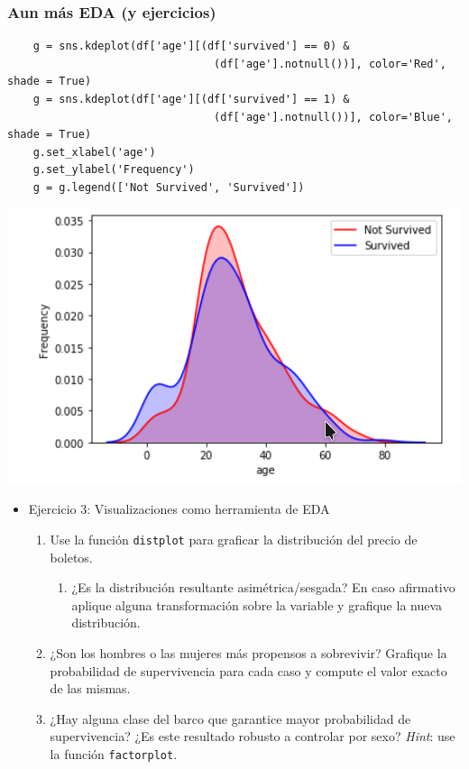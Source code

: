 \documentclass[leqno, 10pt, envcountsect]{beamer}
\numberwithin{equation}{section}
\theoremstyle{definition}
\theoremstyle{example}
\numberwithin{figure}{section}
\numberwithin{table}{section}
\let\olditem\item
\renewcommand{\item}{%
\olditem\vspace{1pt}}
\begin{document}
\begin{frame}[fragile]
  \frametitle{Aun más EDA (y ejercicios)}
    \begin{verbatim}
    g = sns.kdeplot(df['age'][(df['survived'] == 0) &
                                (df['age'].notnull())], color='Red', shade = True)
    g = sns.kdeplot(df['age'][(df['survived'] == 1) &
                                (df['age'].notnull())], color='Blue', shade = True)
    g.set_xlabel('age')
    g.set_ylabel('Frequency')
    g = g.legend(['Not Survived', 'Survived'])
    \end{verbatim}
    \begin{center}
      \includegraphics[scale=0.13]{kde.png}
    \end{center}
  \begin{itemize}
    \item Ejercicio 3: Visualizaciones como herramienta de EDA
      \begin{enumerate}
        \item Use la función \texttt{distplot} para graficar la distribución del
          precio de boletos.
          \begin{enumerate}
            \item ¿Es la distribución resultante asimétrica/sesgada? En caso
              afirmativo aplique alguna transformación sobre la variable y
              grafique la nueva distribución.
          \end{enumerate}
        \item ¿Son los hombres o las mujeres más propensos a sobrevivir?
          Grafique la probabilidad de supervivencia para cada caso y compute el
          valor exacto de las mismas.
        \item ¿Hay alguna clase del barco que garantice mayor probabilidad de
          supervivencia? ¿Es este resultado robusto a controlar por sexo?
          \textit{Hint}: use la función \texttt{factorplot}.
      \end{enumerate}
  \end{itemize}
\end{frame}
\end{document}
